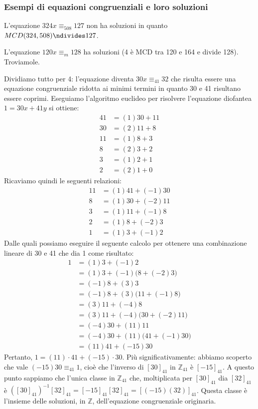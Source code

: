 \subsubsection{Esempi di equazioni congruenziali e loro soluzioni}
\begin{example}
	L'equazione $324x \equiv_{508} 127$ non ha soluzioni in quanto $MCD(324,508) \ndivides 127$.
\end{example}
\begin{example}
	L'equazione $120x \equiv_{m} 128$ ha soluzioni (4 è MCD tra 120 e 164 e divide 128). Troviamole. 
	
	Dividiamo tutto per 4: l'equazione diventa $30x \equiv_{41} 32$ che risulta essere una equazione congruenziale ridotta ai minimi termini in quanto 30 e 41 risultano essere coprimi. Eseguiamo l'algoritmo euclideo per risolvere l'equazione diofantea $1 = 30x + 41y$ si ottiene:
	\begin{align*}
		41 &= (1)30 + 11 \\
		30 &= (2)11 + 8 \\
		11 &=(1)8 + 3 \\
		8 &= (2)3+2 \\
		3 &=(1)2 +1 \\
		2 &=(2)1 +0
	\end{align*} 
Ricaviamo quindi le seguenti relazioni:
\begin{align*}
	11&=(1)41+(-1)30 \\
	8&=(1)30+(-2)11 \\
	3&=(1)11+(-1)8 \\
	2&=(1)8+(-2)3 \\
	1&=(1)3+(-1)2
\end{align*}
Dalle quali possiamo eseguire il seguente calcolo per ottenere una combinazione lineare di 30 e 41 che dia 1 come risultato:
\begin{align*}
	1 &= (1)3 +(-1)2 \\
	&=(1)3+(-1)\bigl(8+(-2)3\bigr)\\
	&= (-1)8 + (3)3 \\
	&=(-1)8 +(3)\bigl(11+(-1)8\bigr)\\
	&=(3)11 +(-4)8 \\
	&=(3)11+(-4)\bigl(30+(-2)11\bigr)\\
	&=(-4)30 + (11)11 \\
	&=(-4)30 + (11)\bigl(41 +(-1)30\bigr)\\
	&=(11)41 +(-15)30
\end{align*}
Pertanto, $1=(11 )\cdot 41 + (-15)\cdot 30$. Più significativamente: abbiamo scoperto che vale $(-15)30 \equiv_{41}  1$, cioè che l'inverso di $[30]_{41}$ in $\mathbb{Z}_{41}$ è $[-15]_{41}$. A questo punto sappiamo che l'unica classe in $\mathbb{Z}_{41}$ che, moltiplicata per $[30]_{41}$ dia $[32]_{41}$ è $([30]_{41})^{-1}[32]_{41}=[-15]_{41}[32]_{41} = [(-15)(32)]_{41}$. Questa classe è l'insieme delle soluzioni, in $\mathbb{Z}$, dell'equazione congruenziale originaria.
\end{example}

